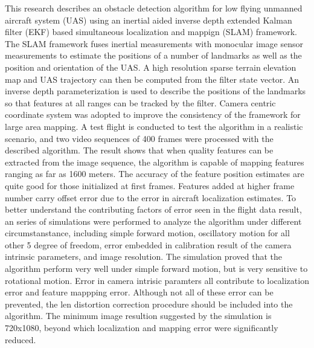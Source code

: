This research describes an obstacle detection algorithm for low flying
unmanned aircraft system (UAS) using an inertial aided inverse depth
extended Kalman filter (EKF) based simultaneous localization and
mappign (SLAM) framework. The SLAM framework fuses inertial
measurements with monocular image sensor measurements to estimate the
positions of a number of landmarks as well as the position and
orientation of the UAS. A high resolution sparse terrain elevation map
and UAS trajectory can then be computed from the filter state vector.
An inverse depth parameterization is used to describe the positions of
the landmarks so that features at all ranges can be tracked by the
filter. Camera centric coordinate system was adopted to improve the
consistency of the framework for large area mapping. A test flight is
conducted to test the algorithm in a realistic scenario, and two video
sequences of 400 frames were processed with the described algorithm.
The result shows that when quality features can be extracted from the
image sequence, the algorithm is capable of mapping features ranging
as far as 1600 meters. The accuracy of the feature position estimates
are quite good for those initialized at first frames. Features added
at higher frame number carry offset error due to the error in aircraft
localization estimates. To better understand the contributing factors
of error seen in the flight data result, an series of simulations were
performed to analyze the algorithm under different circumstanstance,
including simple forward motion, oscillatory motion for all
other 5 degree of freedom, error embedded in calibration result of the
camera intrinsic parameters, and image resolution. The simulation
proved that the algorithm perform very well under simple forward
motion, but is very sensitive to rotational motion. Error in camera
intrisic paramters all contribute to localization error and feature
mappping error. Although not all of these error can be prevented, the
len distortion correction procedure should be included into the
algorithm.  The minimum image resultion suggested by the
simulation is 720x1080, beyond which localization and mapping error
were significantly reduced. 
